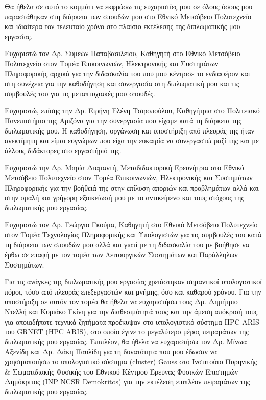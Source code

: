 \begin{acknowledgements}

Θα ήθελα σε αυτό το κομμάτι να εκφράσω τις ευχαριστίες μου σε όλους όσους μου παραστάθηκαν στη διάρκεια των σπουδών μου στο Εθνικό Μετσόβειο Πολυτεχνείο και ιδιαίτερα τον τελευταίο χρόνο στο πλαίσιο εκτέλεσης της διπλωματικής μου εργασίας.

Ευχαριστώ τον Δρ. Συμεών Παπαβασιλείου, Καθηγητή στο Εθνικό Μετσόβειο Πολυτεχνείο στον Τομέα Επικοινωνιών, Ηλεκτρονικής και Συστημάτων Πληροφορικής αρχικά για την διδασκαλία του που μου κέντρισε το ενδιαφέρον και στη συνέχεια για την καθοδήγηση και συνεργασία στη διπλωματική μου και τις συμβουλές του για τις μεταπτυχιακές μου σπουδές.

Ευχαριστώ, επίσης την Δρ. Ειρήνη Ελένη Τσιροπούλου, Καθηγήτρια στο Πολιτειακό Πανεπιστήμιο της Αριζόνα για την συνεργασία που είχαμε κατά τη διάρκεια της διπλωματικής μου. Η καθοδήγηση, οργάνωση και υποστήριξη από πλευράς της ήταν ανεκτίμητη και είμαι ευγνώμων που είχα την ευκαιρία να συνεργαστώ μαζί της και με άλλους διδάκτορες στο εργαστήριό της.

Ευχαριστώ την Δρ. Μαρία Διαμαντή, Μεταδιδακτορική Ερευνήτρια στο Εθνικό Μετσόβειο Πολυτεχνείο στον Τομέα Επικοινωνιών, Ηλεκτρονικής και Συστημάτων Πληροφορικής για την βοήθειά της στην επίλυση αποριών και προβλημάτων αλλά και στην ομαλή και γρήγορη εξοικείωσή μου με το αντικείμενο και τους στόχους της διπλωματικής μου εργασίας.

Ευχαριστώ τον Δρ. Γεώργιο Γκούμα, Καθηγητή στο Εθνικό Μετσόβειο Πολυτεχνείο στον Τομέα Τεχνολογίας Πληροφορικής και Υπολογιστών για τις συμβουλές του κατά τη διάρκεια των σπουδών μου αλλά και γιατί με τη διδασκαλία του με βοήθησε να έρθω σε επαφή με τον τομέα των Λειτουργικών Συστημάτων και Παράλληλων Συστημάτων.

Για τις ανάγκες της διπλωματικής μου εργασίας χρειάστηκαν σημαντικοί υπολογιστικοί πόροι, τόσο από πλευράς επεξεργαστών και μνήμης, όσο και καθαρού χρόνου. Για την υποστήριξη σε αυτόν τον τομέα θα ήθελα να ευχαριστήσω τους Δρ. Δημήτριο Ντελλή και Κυριάκο Γκίνη για την διαθεσιμότητά τους και την άμεση απόκρισή τους για οποιαδήποτε τεχνικά ζητήματα προέκυψαν στο υπολογιστικό σύστημα HPC ARIS του GRNET (\href{https://www.hpc.grnet.gr/}{\underline{HPC ARIS}}), στο οποίο έγινε το μεγαλύτερο μέρος πειραμάτων της διπλωματικής μου εργασίας. Επιπλέον, θα ήθελα να ευχαριστήσω τον Δρ. Μίνωα Αξενίδη και Δρ. Δάκη Παυλίδη για τη δυνατότητα που μου έδωσαν να χρησιμοποιήσω το υπολογιστικό σύστημα (cluster) Gauss στο Ινστιτούτο Πυρηνικής \& Σωματιδιακής Φυσικής του Εθνικού Κέντρου Έρευνας Φυσικών Επιστημών Δημόκριτος (\href{https://www.demokritos.gr/el/institute/%CE%B9%CE%BD%CF%83%CF%84%CE%B9%CF%84%CE%BF%CF%8D%CF%84%CE%BF-%CF%80%CF%85%CF%81%CE%B7%CE%BD%CE%B9%CE%BA%CE%AE%CF%82-%CF%83%CF%89%CE%BC%CE%B1%CF%84%CE%B9%CE%B4%CE%B9%CE%B1%CE%BA%CE%AE%CF%82-%CF%86/}{\underline{INP NCSR Demokritos}}) για την εκτέλεση επιπλέον πειραμάτων της διπλωματικής μου εργασίας.


\end{acknowledgements}
